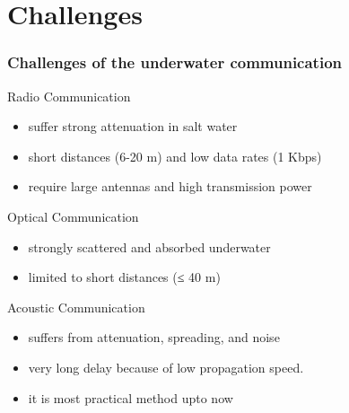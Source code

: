 \documentclass{beamer}
\begin{document}
\section{Challenges}
\begin{frame}

\frametitle{Challenges of the underwater communication}
\begin{block}{Radio Communication}
\begin{itemize}
\item suffer strong attenuation in salt water
\item short distances (6-20 m) and low data rates (1 Kbps)
\item require large antennas and high transmission power
\end{itemize}
\end{block}

\begin{block}{Optical Communication}
\begin{itemize}
\item strongly scattered and absorbed underwater
\item  limited to short distances (≤ 40 m)
\end{itemize}
\end{block}

\begin{block}{Acoustic Communication}
\begin{itemize}
\item suffers from attenuation, spreading, and noise 
\item very long delay because of low propagation speed.
\item it is most practical method upto now 
\end{itemize}
\end{block}
\end{frame}

\end{document}
